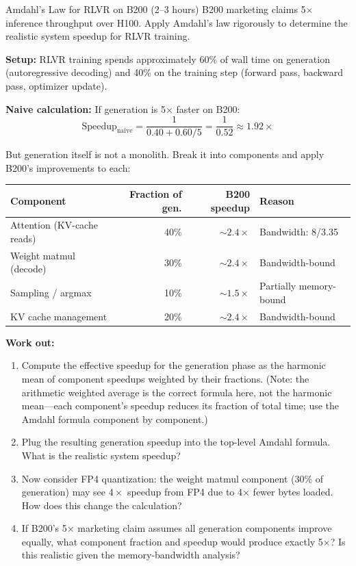 \begin{exercise}{Amdahl's Law for RLVR on B200 (2--3 hours)}
B200 marketing claims 5$\times$ inference throughput over H100. Apply Amdahl's law rigorously to determine the realistic system speedup for RLVR training.

\textbf{Setup:} RLVR training spends approximately 60\% of wall time on generation (autoregressive decoding) and 40\% on the training step (forward pass, backward pass, optimizer update).

\textbf{Naive calculation:} If generation is 5$\times$ faster on B200:
$$\text{Speedup}_{\text{naive}} = \frac{1}{0.40 + 0.60/5} = \frac{1}{0.52} \approx 1.92\times$$

But generation itself is not a monolith. Break it into components and apply B200's improvements to each:

\begin{center}
\begin{tabular}{lrrl}
\hline
\textbf{Component} & \textbf{Fraction of gen.} & \textbf{B200 speedup} & \textbf{Reason} \\
\hline
Attention (KV-cache reads) & 40\% & $\sim 2.4\times$ & Bandwidth: 8/3.35 \\
Weight matmul (decode) & 30\% & $\sim 2.4\times$ & Bandwidth-bound \\
Sampling / argmax & 10\% & $\sim 1.5\times$ & Partially memory-bound \\
KV cache management & 20\% & $\sim 2.4\times$ & Bandwidth-bound \\
\hline
\end{tabular}
\end{center}

\textbf{Work out:}
\begin{enumerate}
  \item Compute the effective speedup for the generation phase as the harmonic mean of component speedups weighted by their fractions. (Note: the arithmetic weighted average is the correct formula here, not the harmonic mean---each component's speedup reduces its fraction of total time; use the Amdahl formula component by component.)
  \item Plug the resulting generation speedup into the top-level Amdahl formula. What is the realistic system speedup?
  \item Now consider FP4 quantization: the weight matmul component (30\% of generation) may see $4\times$ speedup from FP4 due to 4$\times$ fewer bytes loaded. How does this change the calculation?
  \item If B200's 5$\times$ marketing claim assumes all generation components improve equally, what component fraction and speedup would produce exactly 5$\times$? Is this realistic given the memory-bandwidth analysis?
\end{enumerate}


\end{exercise}
